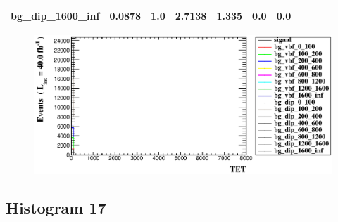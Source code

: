 \documentclass[a4paper, 10pt]{article}
\begin{document}
\begin{table}[H]
\begin{center}
\begin{tabular}{|m{23.0mm}|m{23.0mm}|m{18.0mm}|m{19.0mm}|m{19.0mm}|m{19.0mm}|m{19.0mm}|}
      \hline
      {\cellcolor{white}         bg\_dip\_1600\_inf}& {\cellcolor{white}         0.0878}& {\cellcolor{white}         1.0}& {\cellcolor{white}         2.7138}& {\cellcolor{white}         1.335}& {\cellcolor{green}         0.0}& {\cellcolor{green}         0.0}\\
\hline
    \end{tabular}
  \end{center}
\end{table}

\begin{figure}[H]
  \begin{center}
    \includegraphics[scale=0.45]{selection_15.eps}\\
\caption{   }
  \end{center}
\end{figure}
      \newpage
\subsection{ Histogram 17}
\end{document}
